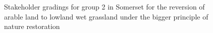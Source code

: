 \documentclass[
  12pt,
  letterpaper,
  DIV=11,
  numbers=noendperiod]{scrartcl}
\begin{document}
\begin{figure}[H]


\caption{\label{fig-SomArBigG2}Stakeholder gradings for group 2 in
Somerset for the reversion of arable land to lowland wet grassland under
the bigger principle of nature restoration}

\end{figure}%
\end{document}
